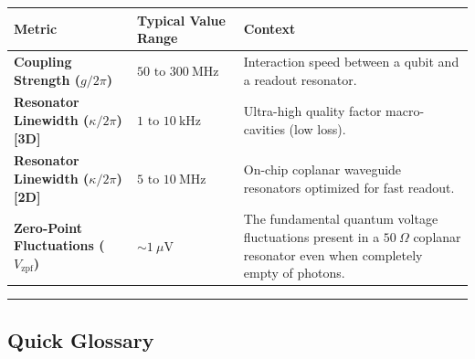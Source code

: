 \documentclass[
]{article}
\begin{document}
\begin{longtable}[]{@{}
  >{\raggedright\arraybackslash}p{}
  >{\raggedright\arraybackslash}p{}
  >{\raggedright\arraybackslash}p{}@{}}
\toprule\noalign{}
\begin{minipage}[b]{\linewidth}\raggedright
Metric
\end{minipage} & \begin{minipage}[b]{\linewidth}\raggedright
Typical Value Range
\end{minipage} & \begin{minipage}[b]{\linewidth}\raggedright
Context
\end{minipage} \\
\midrule\noalign{}
\endhead
\bottomrule\noalign{}
\endlastfoot
\textbf{Coupling Strength (\(g/2\pi\))} &
\(50 \text{ to } 300\ \text{MHz}\) & Interaction speed between a qubit
and a readout resonator. \\
\textbf{Resonator Linewidth (\(\kappa/2\pi\)) {[}3D{]}} &
\(1 \text{ to } 10\ \text{kHz}\) & Ultra-high quality factor
macro-cavities (low loss). \\
\textbf{Resonator Linewidth (\(\kappa/2\pi\)) {[}2D{]}} &
\(5 \text{ to } 10\ \text{MHz}\) & On-chip coplanar waveguide resonators
optimized for fast readout. \\
\textbf{Zero-Point Fluctuations (\(V_{\text{zpf}}\))} &
\(\sim 1\ \mu\text{V}\) & The fundamental quantum voltage fluctuations
present in a \(50\ \Omega\) coplanar resonator even when completely
empty of photons. \\
\end{longtable}

\begin{center}\rule{0.5\linewidth}{0.5pt}\end{center}

\subsection{Quick Glossary}\label{quick-glossary}
\end{document}

